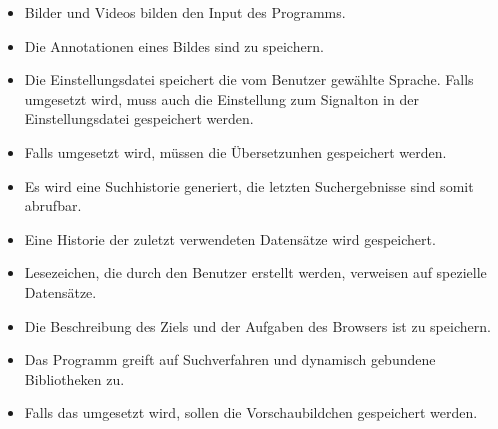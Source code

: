 \begin{itemize}
	\item Bilder und Videos bilden den Input des Programms.
	\item Die Annotationen eines Bildes sind zu speichern.
	\item Die Einstellungsdatei speichert die vom Benutzer gewählte Sprache. Falls  umgesetzt wird, muss auch die Einstellung zum Signalton in der Einstellungsdatei gespeichert werden.
	\item Falls  umgesetzt wird, müssen die Übersetzunhen gespeichert werden.
	\item Es wird eine Suchhistorie generiert, die letzten Suchergebnisse sind somit abrufbar. 
	\item Eine Historie der zuletzt verwendeten Datensätze wird gespeichert.
	\item Lesezeichen, die durch den Benutzer erstellt werden, verweisen auf spezielle Datensätze.
	\item Die Beschreibung des Ziels und der Aufgaben des Browsers ist zu speichern.
	\item Das Programm greift auf Suchverfahren und dynamisch gebundene Bibliotheken zu.
	\item Falls das  umgesetzt wird, sollen die Vorschaubildchen gespeichert werden.
\end{itemize}
\pagebreak
